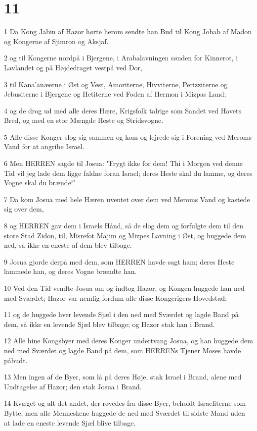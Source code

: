 \chapter{11}

\par 1 Da Kong Jabin af Hazor hørte herom sendte han Bud til Kong Jobab af Madon og Kongerne af Sjimron og Aksjaf.
\par 2 og til Kongerne nordpå i Bjergene, i Arabalavningen sønden for Kinnerot, i Lavlandet og på Højdedraget vestpå ved Dor,
\par 3 til Kana'anæerne i Øst og Vest, Amoriterne, Hivviterne, Perizziterne og Jebusiterne i Bjergene og Hetiterne ved Foden af Hermon i Mizpas Land;
\par 4 og de drog ud med alle deres Hære, Krigsfolk talrige som Sandet ved Havets Bred, og med en stor Mængde Heste og Stridsvogne.
\par 5 Alle disse Konger slog sig sammen og kom og lejrede sig i Forening ved Meroms Vand for at angribe Israel.
\par 6 Men HERREN sagde til Josua: "Frygt ikke for dem! Thi i Morgen ved denne Tid vil jeg lade dem ligge faldne foran Israel; deres Heste skal du lamme, og deres Vogne skal du brænde!"
\par 7 Da kom Josua med hele Hæren uventet over dem ved Meroms Vand og kastede sig over dem,
\par 8 og HERREN gav dem i Israels Hånd, så de slog dem og forfulgte dem til den store Stad Zidon, til, Misrefot Majim og Mizpes Lavning i Øst, og huggede dem ned, så ikke en eneste af dem blev tilbage.
\par 9 Josua gjorde derpå med dem, som HERREN havde sagt ham; deres Heste lammede han, og deres Vogne brændte han.
\par 10 Ved den Tid vendte Josua om og indtog Hazor, og Kongen huggede han ned med Sværdet; Hazor var nemlig fordum alle disse Kongerigers Hovedstad;
\par 11 og de huggede hver levende Sjæl i den ned med Sværdet og lagde Band på dem, så ikke en levende Sjæl blev tilbage; og Hazor stak han i Brand.
\par 12 Alle hine Kongsbyer med deres Konger undertvang Josua, og han huggede dem ned med Sværdet og lagde Band på dem, som HERRENs Tjener Moses havde påbudt.
\par 13 Men ingen af de Byer, som lå på deres Høje, stak Israel i Brand, alene med Undtagelse af Hazor; den stak Josua i Brand.
\par 14 Kvæget og alt det andet, der røvedes fra disse Byer, beholdt Israeliterne som Bytte; men alle Menneskene huggede de ned med Sværdet til sidste Mand uden at lade en eneste levende Sjæl blive tilbage.
